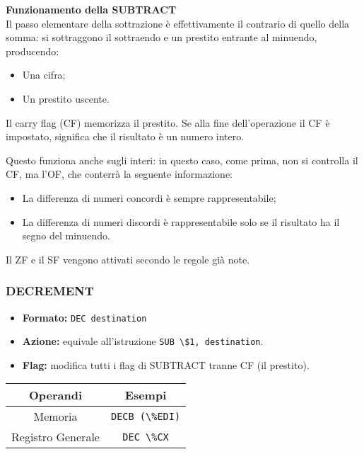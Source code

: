 \documentclass[a4paper,11pt]{article}
\begin{document}
\par\medskip
\noindent
\textbf{\textsf{Funzionamento della SUBTRACT}} \\
Il passo elementare della sottrazione è effettivamente il contrario di quello della somma: si sottraggono il sottraendo e un prestito entrante al minuendo, producendo:
\begin{itemize}
	\item Una cifra;
	\item Un prestito uscente.
\end{itemize}

Il carry flag (CF) memorizza il prestito.
Se alla fine dell'operazione il CF è impostato, significa che il risultato è un numero intero.

Questo funziona anche sugli interi: in questo caso, come prima, non si controlla il CF, ma l'OF, che conterrà la seguente informazione:
\begin{itemize}
	\item La differenza di numeri concordi è sempre rappresentabile;
	\item La differenza di numeri discordi è rappresentabile solo se il risultato ha il segno del minuendo.
\end{itemize}

Il ZF e il SF vengono attivati secondo le regole già note.

\subsubsection{DECREMENT}
\begin{itemize}
	\item \textbf{Formato:} \lstinline|DEC destination|
	\item \textbf{Azione:} equivale all'istruzione \lstinline|SUB \$1, destination|. 
	\item \textbf{Flag:} modifica tutti i flag di SUBTRACT tranne CF (il prestito).
\end{itemize}

		\begin{table}[h!]
			\center {}
			\begin{tabular} { c | c }
				\bfseries Operandi & \bfseries Esempi \\
				\hline 
				Memoria & \lstinline|DECB (\%EDI)| \\
				Registro Generale & \lstinline|DEC \%CX|
			\end{tabular}
		\end{table}
\end{document}

